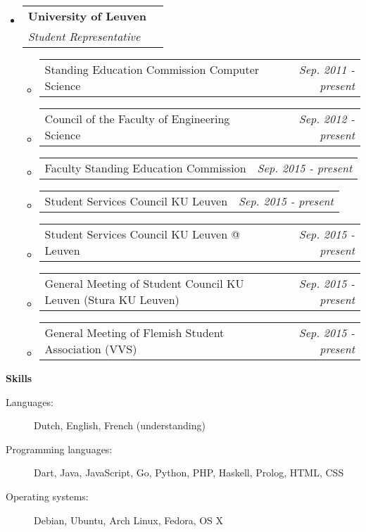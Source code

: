 \documentclass[letterpaper,11pt]{article}
\makeatletter
\newcommand{\resheading}[1]{{\large \colorbox{mygrey}{\begin{minipage}{\textwidth}{\textbf{#1 \vphantom{p\^{E}}}}\end{minipage}}}}
\newcommand{\ressubheading}[4]{
\begin{tabular*}{7.3in}{l@{\extracolsep{\fill}}r}
		\textbf{#1} & #2 \\
		\textit{#3} & \textit{#4} \\
\end{tabular*}\vspace{-6pt}}
\newcommand{\resdateitem}[2]{\item
\begin{tabular*}{6.95in}{l@{\extracolsep{\fill}}r}
		#1 & \textit{#2} \\
\end{tabular*}\vspace{-3pt}}
\makeatother
\begin{document}
\begin{itemize}[leftmargin=*]
\item[]
	\ressubheading{University of Leuven}{ }{Student Representative}{ }
	\begin{itemize}
		\resdateitem{Standing Education Commission Computer Science}{Sep. 2011 - present}
		\resdateitem{Council of the Faculty of Engineering Science}{Sep. 2012 - present}
		\resdateitem{Faculty Standing Education Commission}{Sep. 2015 - present} %
		\resdateitem{Student Services Council KU Leuven}{Sep. 2015 - present}
		\resdateitem{Student Services Council KU Leuven @ Leuven}{Sep. 2015 - present}
		\resdateitem{General Meeting of Student Council KU Leuven (Stura KU Leuven)}{Sep. 2015 - present}
		\resdateitem{General Meeting of Flemish Student Association (VVS)}{Sep. 2015 - present}
	\end{itemize}


\end{itemize}


\resheading{Skills}

\begin{description}
\item[Languages:]
Dutch, English, French (understanding)
\item[Programming languages:]
Dart, Java, JavaScript, Go, Python, PHP, Haskell, Prolog, HTML, CSS
\item[Operating systems:]
Debian, Ubuntu, Arch Linux, Fedora, OS X
\end{description}


%
%
\end{document}
